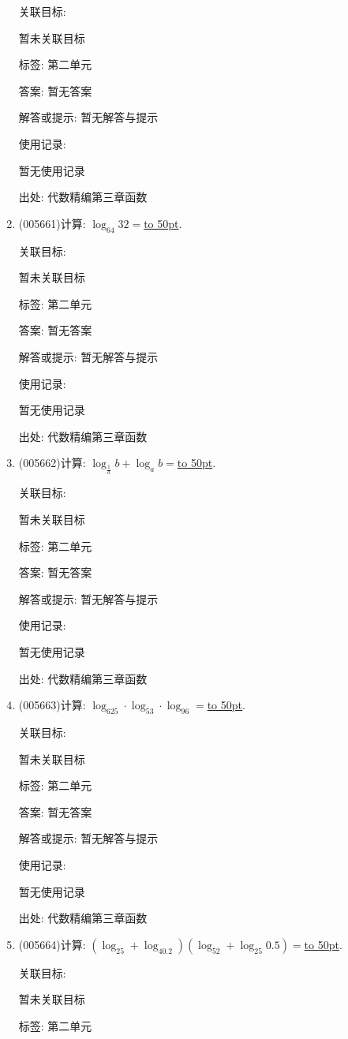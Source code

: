 \documentclass[10pt,a4paper]{article}
\newcommand{\blank}[1]{\underline{\hbox to #1pt{}}}
\begin{document}
\begin{enumerate}[1.]
关联目标:

暂未关联目标



标签: 第二单元

答案: 暂无答案

解答或提示: 暂无解答与提示

使用记录:

暂无使用记录


出处: 代数精编第三章函数
\item { (005661)}计算: $\log_{64}32=$\blank{50}.


关联目标:

暂未关联目标



标签: 第二单元

答案: 暂无答案

解答或提示: 暂无解答与提示

使用记录:

暂无使用记录


出处: 代数精编第三章函数
\item { (005662)}计算: $\log_{\frac 1a}b+\log_ab=$\blank{50}.


关联目标:

暂未关联目标



标签: 第二单元

答案: 暂无答案

解答或提示: 暂无解答与提示

使用记录:

暂无使用记录


出处: 代数精编第三章函数
\item { (005663)}计算: $\log_625\cdot \log_53\cdot \log_96=$\blank{50}.


关联目标:

暂未关联目标



标签: 第二单元

答案: 暂无答案

解答或提示: 暂无解答与提示

使用记录:

暂无使用记录


出处: 代数精编第三章函数
\item { (005664)}计算: $(\log_25+\log_40.2)(\log_52+\log_{25}0.5)=$\blank{50}.


关联目标:

暂未关联目标



标签: 第二单元


\end{enumerate}
\end{document}
